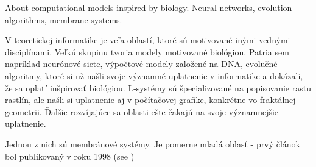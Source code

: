 
About computational models inspired by biology. Neural networks, evolution algorithms, membrane systems.

V teoretickej informatike je veľa oblastí, ktoré sú motivované inými vednými
disciplínami. Veľkú skupinu tvoria modely motivované biológiou. Patria sem
napríklad neurónové siete, výpočtové modely založené na DNA, evolučné algoritmy, ktoré
si už našli svoje významné uplatnenie v informatike a dokázali, že sa oplatí
inšpirovať biológiou. L-systémy sú špecializované na popisovanie rastu rastlín, ale našli si uplatnenie aj v počítačovej grafike, konkrétne vo fraktálnej geometrii. Ďalšie rozvíjajúce sa oblasti ešte čakajú na svoje významnejšie uplatnenie.

Jednou z nich sú membránové systémy. Je pomerne mladá oblasť - prvý článok
bol publikovaný v roku 1998 (see \cite{Paun98})